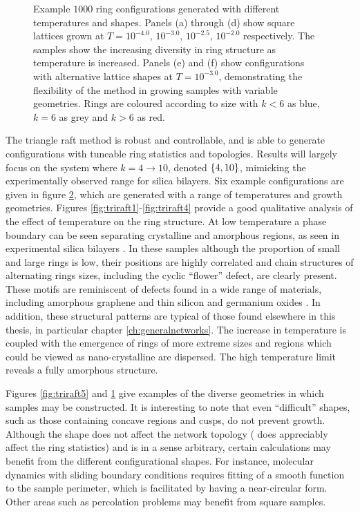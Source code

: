 \begin{figure}[p]
\begin{subfigure}[b]{0.35\textwidth}
         \caption{}
         \label{fig:triraft6}
     \end{subfigure}
     
     \caption{Example $1000$ ring configurations generated with different temperatures and shapes. Panels (a) through (d) show square lattices grown at $T=10^{-4.0},\,10^{-3.0},\,10^{-2.5},\, 10^{-2.0}$ respectively. The samples show the increasing diversity in ring structure as temperature is increased. Panels (e) and (f) show configurations with alternative lattice shapes at $T=10^{-3.0}$, demonstrating the flexibility of the method in growing samples with variable geometries. Rings are coloured according to size with $k<6$ as blue, $k=6$ as grey and $k>6$ as red.}
     \label{fig:triraft}
\end{figure} 
 
The triangle raft method is robust and controllable, and is able to generate configurations with tuneable ring statistics and topologies.
Results will largely focus on the system where $k=4\rightarrow10$, denoted $\left\{4,10\right\}$, mimicking the experimentally observed range for silica bilayers. 
Six example configurations are given in figure \ref{fig:triraft}, which are generated with a range of temperatures and growth geometries. 
Figures \ref{fig:triraft1}\--\ref{fig:triraft4} provide a good qualitative analysis of the effect of temperature on the ring structure. 
At low temperature a phase boundary can be seen separating crystalline and amorphous regions, as seen in experimental silica bilayers \cite{Lichtenstein2012b}. 
In these samples although the proportion of small and large rings is low, their positions are highly correlated and chain structures of alternating rings sizes, including the cyclic ``flower'' defect, are clearly present. 
These motifs are reminiscent of defects found in a wide range of materials, including amorphous graphene and thin silicon and germanium oxides \cite{Bjorkman2013,Robertson2012,Buchner2017,Lewandowski2018}. 
In addition, these structural patterns are typical of those found elsewhere in this thesis, in particular chapter \ref{ch:generalnetworks}.
The increase in temperature is coupled with the emergence of rings of more extreme sizes and regions which could be viewed as nano\--crystalline are dispersed. 
The high temperature limit reveals a fully amorphous structure.

Figures \ref{fig:triraft5} and \ref{fig:triraft6} give examples of the diverse geometries in which samples may be constructed. 
It is interesting to note that even ``difficult'' shapes, such as those containing concave regions and cusps, do not prevent growth.  
Although the shape does not affect the network topology (\ie{} does appreciably affect the ring statistics) and is in a sense arbitrary, certain calculations may benefit from the different configurational shapes. 
For instance, molecular dynamics with sliding boundary conditions requires fitting of a smooth function to the sample perimeter, which is facilitated by having a near\--circular form.
Other areas such as percolation problems may benefit from square samples.


